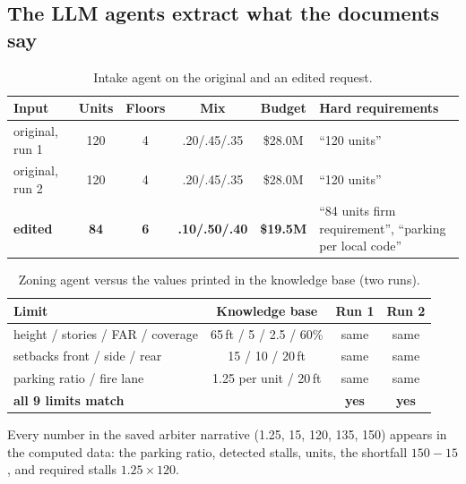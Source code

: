 \documentclass[10pt,a4paper]{article}
\theoremstyle{definition}
\begin{document}
\subsection{The LLM agents extract what the documents say}

\begin{table}[H]
\centering\small
\caption{Intake agent on the original and an edited request.}
\begin{tabular}{@{}l c c c c l@{}}
\toprule
\textbf{Input} & \textbf{Units} & \textbf{Floors} & \textbf{Mix} & \textbf{Budget} & \textbf{Hard requirements} \\ \midrule
original, run 1 & 120 & 4 & .20/.45/.35 & \$28.0M & ``120 units'' \\
original, run 2 & 120 & 4 & .20/.45/.35 & \$28.0M & ``120 units'' \\
\textbf{edited} & \textbf{84} & \textbf{6} & \textbf{.10/.50/.40} & \textbf{\$19.5M} & ``84 units firm requirement'', ``parking per local code'' \\
\bottomrule
\end{tabular}
\end{table}

\begin{table}[H]
\centering\small
\caption{Zoning agent versus the values printed in the knowledge base (two runs).}
\begin{tabular}{@{}l c c c@{}}
\toprule
\textbf{Limit} & \textbf{Knowledge base} & \textbf{Run 1} & \textbf{Run 2} \\ \midrule
height / stories / FAR / coverage & 65\,ft / 5 / 2.5 / 60\% & same & same \\
setbacks front / side / rear & 15 / 10 / 20\,ft & same & same \\
parking ratio / fire lane & 1.25 per unit / 20\,ft & same & same \\
\textbf{all 9 limits match} & & \textbf{yes} & \textbf{yes} \\
\bottomrule
\end{tabular}
\end{table}

Every number in the saved arbiter narrative (1.25, 15, 120, 135, 150) appears in the computed data: the parking ratio,
detected stalls, units, the shortfall $150-15$, and required stalls $1.25\times120$.
\end{document}
